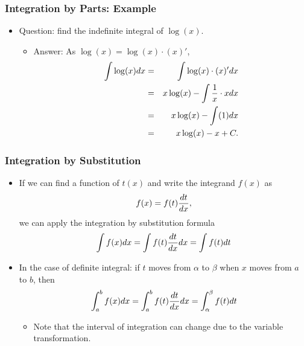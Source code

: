 \documentclass[pdflatex, 12pt]{beamer}
\begin{document}
\begin{frame}
\frametitle{Integration by Parts: Example}
\begin{itemize}
\item Question: find the indefinite integral of $\log(x)$.
\vspace{0.4cm}
 \begin{itemize}
 \item Answer: As $\log(x) = \log(x) \cdot (x)'$,
  \begin{eqnarray}
  \int \log(x) dx &=& \int \log(x) \cdot (x)' dx \notag \\
  &=& x\log(x) - \int \frac{1}{x} \cdot x dx \notag \\
  &=& x\log(x) - \int (1) dx \notag \\
  &=& x\log(x) - x + C. \notag
  \end{eqnarray}
 \end{itemize}
\end{itemize}
\end{frame}

\begin{frame}
\frametitle{Integration by Substitution}
\begin{itemize}
\item If we can find a function of $t(x)$ and write the integrand $f(x)$ as 
 \begin{equation}
 f(x) = f(t) \frac{dt}{dx}, \notag
 \end{equation}
we can apply the integration by substitution formula
 \begin{equation}
 \int f(x) dx = \int f(t) \frac{dt}{dx} dx = \int f(t) dt \notag
 \end{equation}
\item In the case of definite integral: if $t$ moves from $\alpha$ to $\beta$ when $x$ moves from $a$ to $b$, then
 \begin{equation}
 \int^b_a f(x) dx = \int^b_a f(t) \frac{dt}{dx} dx = \int^{\beta}_{\alpha} f(t) dt \notag
 \end{equation}
 \begin{itemize}
 \item Note that the interval of integration can change due to the variable transformation.
 \end{itemize}
\end{itemize}
\end{frame}
\end{document}
